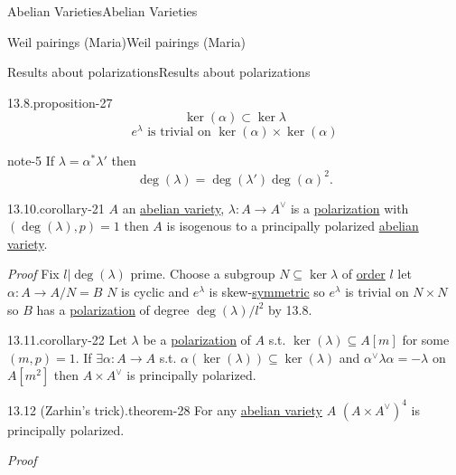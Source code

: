 \documentclass[10pt,]{book}
\makeatletter
\renewcommand*{\proofname}{Proof}
\renewenvironment{proof}[1][\proofname]{\par
  \pushQED{\qed}%
  \normalfont \topsep6\p@\@plus6\p@\relax
  \trivlist
  \item\relax
    {\itshape
    #1\@addpunct{.}}\hspace\labelsep\ignorespaces
}{%
  \popQED\endtrivlist\@endpefalse
}
\numberwithin{equation}{section}
\newcommand{\lb}{[}
\newcommand{\rb}{]}
\makeatother
\begin{document}
\begin{chapterptx}{Abelian Varieties}{}{Abelian Varieties}{}{}
\begin{sectionptx}{Weil pairings (Maria)}{}{Weil pairings (Maria)}{}{}
\begin{subsectionptx}{Results about polarizations}{}{Results about polarizations}{}{}
\begin{proposition}{13.8.}{}{proposition-27}
\begin{equation*}
\ker(\alpha) \subset \ker \lambda
\end{equation*}
%
\begin{equation*}
e^{\lambda} \text{ is trivial on } \ker (\alpha)\times \ker(\alpha)
\end{equation*}
%
\end{proposition}
\begin{note}{}{note-5}%
\hypertarget{p-323}{}%
If \(\lambda = \alpha^* \lambda'\) then%
\begin{equation*}
\deg(\lambda) = \deg (\lambda') \deg(\alpha)^2\text{.}
\end{equation*}
%
\end{note}
\begin{corollary}{13.10.}{}{corollary-21}%
\hypertarget{p-324}{}%
\(A\) an \hyperref[def-buntes-abvar]{abelian variety}, \(\lambda \colon A \to A^\vee\) is a \hyperref[def-polarization]{polarization} with \((\deg (\lambda), p) = 1\) then \(A\) is  isogenous to a principally polarized \hyperref[def-buntes-abvar]{abelian variety}.%
\end{corollary}
\begin{proof}\hypertarget{proof-54}{}
\hypertarget{p-325}{}%
Fix \(l |\deg(\lambda)\) prime. Choose a subgroup \(N\subseteq \ker \lambda\) of \hyperref[def-order-quaternion]{order} \(l\) let \(\alpha \colon A\to A/N = B\) \(N\) is cyclic and \(e^\lambda\) is skew-\hyperref[def-princ-pol]{symmetric} so \(e^{\lambda}\) is trivial on \(N\times N\) so \(B\) has a \hyperref[def-polarization]{polarization} of degree \(\deg(\lambda) / l^2\) by 13.8.%
\end{proof}
\begin{corollary}{13.11.}{}{corollary-22}%
\hypertarget{p-326}{}%
Let \(\lambda\) be a \hyperref[def-polarization]{polarization} of \(A\) s.t. \(\ker (\lambda) \subseteq A\lb m \rb\) for some \((m,p)=1\). If \(\exists \alpha \colon A \to A\) s.t. \(\alpha(\ker (\lambda)) \subseteq \ker(\lambda)\) and \(\alpha^\vee \lambda \alpha = - \lambda\) on \(A\lb m^2\rb\) then \(A\times A^\vee\) is principally polarized.%
\end{corollary}
\begin{theorem}{13.12 (Zarhin's trick).}{}{theorem-28}%
\hypertarget{p-327}{}%
For any \hyperref[def-buntes-abvar]{abelian variety} \(A\) \((A\times A^\vee)^4\) is principally polarized.%
\end{theorem}
\begin{proof}\hypertarget{proof-55}{}
\hypertarget{p-328}{}%

\end{proof}
\end{subsectionptx}
\end{sectionptx}
\end{chapterptx}
\end{document}
